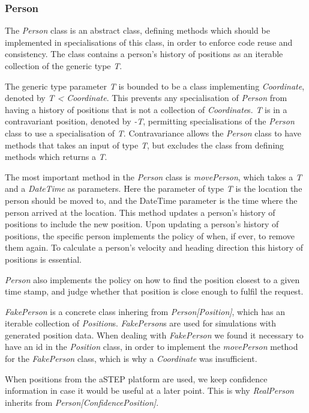 \subsubsection{Person}
The \emph{Person} class is an abstract class, defining methods which should be implemented in specialisations of this class, in order to enforce code reuse and consistency. The class contains a person's history of positions as an iterable collection of the generic type \emph{T}.

The generic type parameter \emph{T} is bounded to be a class implementing \emph{Coordinate}, denoted by \emph{T < Coordinate}. This prevents any specialisation of \emph{Person} from having a history of positions that is not a collection of \emph{Coordinate}s. \emph{T} is in a contravariant position, denoted by \emph{-T}, permitting specialisations of the \emph{Person} class to use a specialisation of \emph{T}. Contravariance allows the \emph{Person} class to have methods that takes an input of type \emph{T}, but excludes the class from defining methods which returns a \emph{T}. 

The most important method in the \emph{Person} class is \emph{movePerson}, which takes a \emph{T} and a \emph{DateTime} as parameters. Here the parameter of type \emph{T} is the location the person should be moved to, and the DateTime parameter is the time where the person arrived at the location. This method updates a person's history of positions to include the new position. Upon updating a person's history of positions, the specific person implements the policy of when, if ever, to remove them again. To calculate a person's velocity and heading direction this history of positions is essential.

\emph{Person} also implements the policy on how to find the position closest to a given time stamp, and judge whether that position is close enough to fulfil the request.

\emph{FakePerson} is a concrete class inhering from \emph{Person[Position]}, which has an iterable collection of \emph{Position}s. \emph{FakePerson}s are used for simulations with generated position data. When dealing with \emph{FakePerson} we found it necessary to have an id in the \emph{Position} class, in order to implement the \emph{movePerson} method for the \emph{FakePerson} class, which is why a \emph{Coordinate} was insufficient. 

When positions from the aSTEP platform are used, we keep confidence information in case it would be useful at a later point. This is why \emph{RealPerson} inherits from \emph{Person[ConfidencePosition]}.

